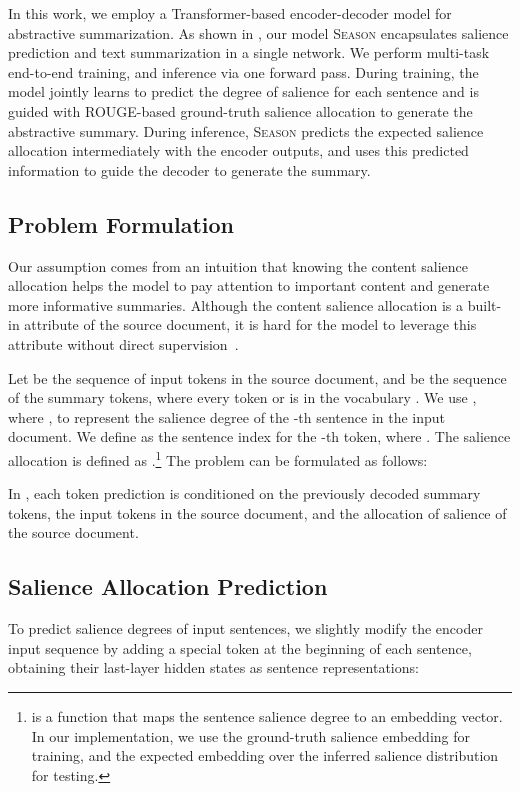 \documentclass[11pt]{article}
\newcommand{\MODEL}{\mbox{\textsc{Season}}\xspace}
\begin{document}
In this work, we employ a Transformer-based encoder-decoder model for abstractive summarization.
As shown in , our model \MODEL encapsulates salience prediction and text summarization in a single network.
We perform multi-task end-to-end training, and inference via one forward pass.
During training, the model jointly learns to predict the degree of salience for each sentence and is guided with ROUGE-based ground-truth salience allocation to generate the abstractive summary. 
During inference, \MODEL predicts the expected salience allocation intermediately with the encoder outputs, and uses this predicted information to guide the decoder to generate the summary.

\subsection{Problem Formulation}
Our assumption comes from an intuition that knowing the content salience allocation helps the model to pay attention to important content and generate more informative summaries.
Although the content salience allocation is a built-in attribute of the source document, it is hard for the model to leverage this attribute without direct supervision~\cite{li2020keywords,saito2020abstractive,dou2021gsum}.

Let  be the sequence of input tokens in the source document, and  be the sequence of the summary tokens, where every token  or  is in the vocabulary .
We use , where , to represent the salience degree of the -th sentence in the input document.
We define  as the sentence index for the -th token, where .
The salience allocation is defined as .\footnote{ is a function that maps the sentence salience degree to an embedding vector. In our implementation, we use the ground-truth salience embedding for training, and the expected embedding over the inferred salience distribution for testing.}
The problem can be formulated as follows:
\vspace{-1mm}

In , each token prediction is conditioned on the previously decoded summary tokens, the input tokens in the source document, and the allocation of salience of the source document.

\subsection{Salience Allocation Prediction}
To predict salience degrees of input sentences, we slightly modify the encoder input sequence by adding a special token at the beginning of each sentence, obtaining their last-layer hidden states as sentence representations:
\vspace{-1mm}
\end{document}
